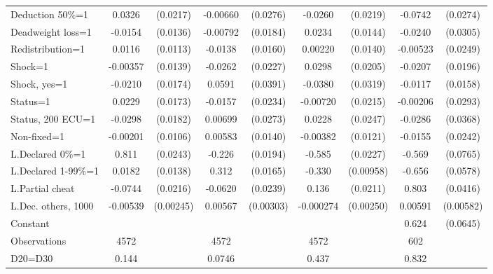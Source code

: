 \begin{tabular}{l|cccccc|cc}
Deduction 50\%=1&   0.0326         & (0.0217)& -0.00660         & (0.0276)&  -0.0260         & (0.0219)&  -0.0742\sym{***}& (0.0274)\\
Deadweight loss=1&  -0.0154         & (0.0136)& -0.00792         & (0.0184)&   0.0234         & (0.0144)&  -0.0240         & (0.0305)\\
Redistribution=1&   0.0116         & (0.0113)&  -0.0138         & (0.0160)&  0.00220         & (0.0140)& -0.00523         & (0.0249)\\
Shock=1         & -0.00357         & (0.0139)&  -0.0262         & (0.0227)&   0.0298         & (0.0205)&  -0.0207         & (0.0196)\\
Shock, yes=1    &  -0.0210         & (0.0174)&   0.0591         & (0.0391)&  -0.0380         & (0.0319)&  -0.0117         & (0.0158)\\
Status=1        &   0.0229         & (0.0173)&  -0.0157         & (0.0234)& -0.00720         & (0.0215)& -0.00206         & (0.0293)\\
Status, 200 ECU=1&  -0.0298         & (0.0182)&  0.00699         & (0.0273)&   0.0228         & (0.0247)&  -0.0286         & (0.0368)\\
Non-fixed=1     & -0.00201         & (0.0106)&  0.00583         & (0.0140)& -0.00382         & (0.0121)&  -0.0155         & (0.0242)\\
L.Declared 0\%=1&    0.811\sym{***}& (0.0243)&   -0.226\sym{***}& (0.0194)&   -0.585\sym{***}& (0.0227)&   -0.569\sym{***}& (0.0765)\\
L.Declared 1-99\%=1&   0.0182         & (0.0138)&    0.312\sym{***}& (0.0165)&   -0.330\sym{***}&(0.00958)&   -0.656\sym{***}& (0.0578)\\
L.Partial cheat &  -0.0744\sym{***}& (0.0216)&  -0.0620\sym{***}& (0.0239)&    0.136\sym{***}& (0.0211)&    0.803\sym{***}& (0.0416)\\
L.Dec. others, 1000& -0.00539\sym{**} &(0.00245)&  0.00567\sym{*}  &(0.00303)&-0.000274         &(0.00250)&  0.00591         &(0.00582)\\
Constant        &                  &         &                  &         &                  &         &    0.624\sym{***}& (0.0645)\\
\hline
Observations    &     4572         &         &     4572         &         &     4572         &         &      602         &         \\
D20=D30         &    0.144         &         &   0.0746         &         &    0.437         &         &    0.832         &         \\

\end{tabular}
